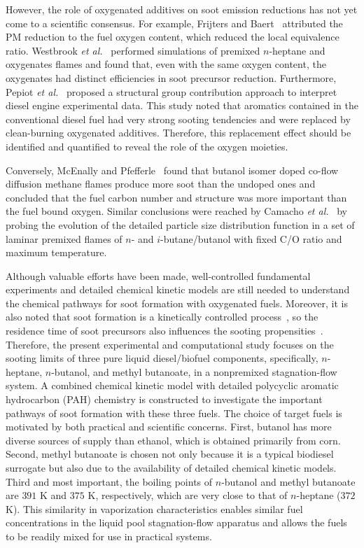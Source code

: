 \documentclass[review,3p,times]{elsarticleUS}
\begin{document}
However, the role of oxygenated additives on soot emission reductions has not yet come to a scientific consensus. For example, Frijters and Baert~\cite{frijters06} attributed the PM reduction to the fuel oxygen content, which reduced the local equivalence ratio. Westbrook \emph{et al.}~\cite{westbrook06} performed simulations of premixed $n$-heptane and oxygenates flames and found that, even with the same oxygen content, the oxygenates had distinct efficiencies in soot precursor reduction. Furthermore, Pepiot \emph{et al.}~\cite{pepiot08} proposed a structural group contribution approach to interpret diesel engine experimental data. This study noted that aromatics contained in the conventional diesel fuel had very strong sooting tendencies and were replaced by clean-burning oxygenated additives. Therefore, this replacement effect should be identified and quantified to reveal the role of the oxygen moieties. 

Conversely, McEnally and Pfefferle~\cite{mcenally05,mcenally11} found that butanol isomer doped co-flow diffusion methane flames produce more soot than the undoped ones and concluded that the fuel  carbon number and structure was more important than the fuel bound oxygen. Similar conclusions were reached by Camacho \emph{et al.}~\cite{camacho13} by probing the evolution of the detailed particle size distribution function in a set of laminar premixed flames of $n$- and $i$-butane/butanol with fixed C/O ratio and maximum temperature. 

Although valuable efforts have been made, well-controlled fundamental experiments and detailed chemical kinetic models are still needed to understand the chemical pathways for soot formation with oxygenated fuels. Moreover, it is also noted that soot formation is a kinetically controlled process~\cite{vandsburger85}, so the residence time of soot precursors also influences the sooting propensities~\cite{tsuji71}. Therefore, the present experimental and computational study focuses on the sooting limits of three pure liquid diesel/biofuel components, specifically, $n$-heptane, $n$-butanol, and methyl butanoate, in a nonpremixed stagnation-flow system. A combined chemical kinetic model with detailed polycyclic aromatic hydrocarbon (PAH) chemistry is constructed to investigate the important pathways of soot formation with these three fuels. The choice of target fuels is motivated by both practical and scientific concerns. First, butanol has more diverse sources of supply than ethanol, which is obtained primarily from corn. Second, methyl butanoate is chosen not only because it is a typical biodiesel surrogate but also due to the availability of detailed chemical kinetic models. Third and most important, the boiling points of $n$-butanol and methyl butanoate are $391$ K and $375$ K, respectively, which are very close to that of $n$-heptane ($372$ K). This similarity in vaporization characteristics enables similar fuel concentrations in the liquid pool stagnation-flow apparatus and allows the fuels to be readily mixed for use in practical systems.
\end{document}
